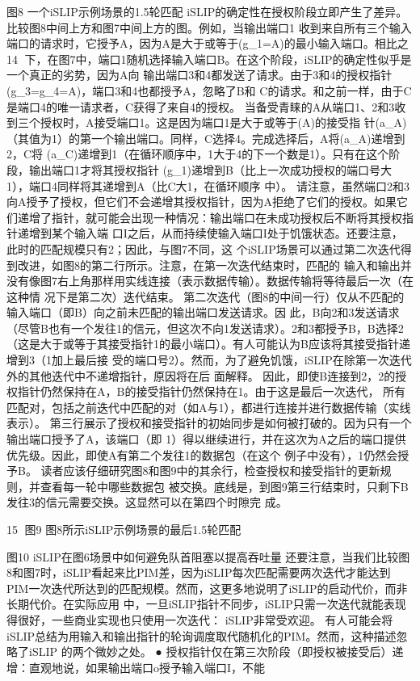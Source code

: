 图8 一个iSLIP示例场景的1.5轮匹配
iSLIP的确定性在授权阶段立即产生了差异。比较图8中间上方和图7中间上方的图。例如，当输出端口1
收到来自所有三个输入端口的请求时，它授予A，因为A是大于或等于(g_{1}=A)的最小输入端口。相比之
                                                       14
下，在图7中，端口1随机选择输入端口B。在这个阶段，iSLIP的确定性似乎是一个真正的劣势，因为A向
输出端口3和4都发送了请求。由于3和4的授权指针(g_{3}=g_{4}=A)，端口3和4也都授予A，忽略了B和
C的请求。和之前一样，由于C是端口4的唯一请求者，C获得了来自4的授权。
当备受青睐的A从端口1、2和3收到三个授权时，A接受端口1。这是因为端口1是大于或等于(A)的接受指
针(a_{A})（其值为1）的第一个输出端口。同样，C选择4。完成选择后，A将(a_{A})递增到2，C将
(a_{C})递增到1（在循环顺序中，1大于4的下一个数是1）。只有在这个阶段，输出端口1才将其授权指针
(g_{1})递增到B（比上一次成功授权的端口号大1），端口4同样将其递增到A（比C大1，在循环顺序
中）。
请注意，虽然端口2和3向A授予了授权，但它们不会递增其授权指针，因为A拒绝了它们的授权。如果它
们递增了指针，就可能会出现一种情况：输出端口在未成功授权后不断将其授权指针递增到某个输入端
口I之后，从而持续使输入端口I处于饥饿状态。还要注意，此时的匹配规模只有2；因此，与图7不同，这
个iSLIP场景可以通过第二次迭代得到改进，如图8的第二行所示。注意，在第一次迭代结束时，匹配的
输入和输出并没有像图7右上角那样用实线连接（表示数据传输）。数据传输将等待最后一次（在这种情
况下是第二次）迭代结束。
第二次迭代（图8的中间一行）仅从不匹配的输入端口（即B）向之前未匹配的输出端口发送请求。因
此，B向2和3发送请求（尽管B也有一个发往1的信元，但这次不向1发送请求）。2和3都授予B，B选择2
（这是大于或等于其接受指针1的最小端口）。有人可能认为B应该将其接受指针递增到3（1加上最后接
受的端口号2）。然而，为了避免饥饿，iSLIP在除第一次迭代外的其他迭代中不递增指针，原因将在后
面解释。
因此，即使B连接到2，2的授权指针仍然保持在A，B的接受指针仍然保持在1。由于这是最后一次迭代，
所有匹配对，包括之前迭代中匹配的对（如A与1），都进行连接并进行数据传输（实线表示）。
第三行展示了授权和接受指针的初始同步是如何被打破的。因为只有一个输出端口授予了A，该端口（即
1）得以继续进行，并在这次为A之后的端口提供优先级。因此，即使A有第二个发往1的数据包（在这个
例子中没有），1仍然会授予B。
读者应该仔细研究图8和图9中的其余行，检查授权和接受指针的更新规则，并查看每一轮中哪些数据包
被交换。底线是，到图9第三行结束时，只剩下B发往3的信元需要交换。这显然可以在第四个时隙完
成。




                                                      15
图9 图8所示iSLIP示例场景的最后1.5轮匹配




图10 iSLIP在图6场景中如何避免队首阻塞以提高吞吐量
还要注意，当我们比较图8和图7时，iSLIP看起来比PIM差，因为iSLIP每次匹配需要两次迭代才能达到
PIM一次迭代所达到的匹配规模。然而，这更多地说明了iSLIP的启动代价，而非长期代价。在实际应用
中，一旦iSLIP指针不同步，iSLIP只需一次迭代就能表现得很好，一些商业实现也只使用一次迭代：
iSLIP非常受欢迎。
有人可能会将iSLIP总结为用输入和输出指针的轮询调度取代随机化的PIM。然而，这种描述忽略了iSLIP
的两个微妙之处。
  ● 授权指针仅在第三次阶段（即授权被接受后）递增：直观地说，如果输出端口o授予输入端口I，不能


